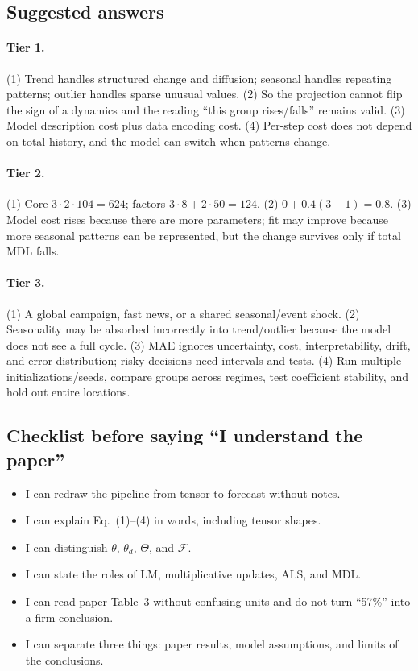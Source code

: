 \subsection*{Suggested answers}

\paragraph{Tier 1.}
(1) Trend handles structured change and diffusion; seasonal handles repeating patterns; outlier handles
sparse unusual values. (2) So the projection cannot flip the sign of a dynamics and the reading
``this group rises/falls'' remains valid. (3) Model description cost plus data encoding cost.
(4) Per-step cost does not depend on total history, and the model can switch when patterns change.

\paragraph{Tier 2.}
(1) Core $3\cdot2\cdot104=624$; factors $3\cdot8+2\cdot50=124$. (2) $0+0.4(3-1)=0.8$.
(3) Model cost rises because there are more parameters; fit may improve because more seasonal patterns
can be represented, but the change survives only if total MDL falls.

\paragraph{Tier 3.}
(1) A global campaign, fast news, or a shared seasonal/event shock. (2) Seasonality may be absorbed
incorrectly into trend/outlier because the model does not see a full cycle. (3) MAE ignores uncertainty,
cost, interpretability, drift, and error distribution; risky decisions need intervals and tests.
(4) Run multiple initializations/seeds, compare groups across regimes, test coefficient stability, and
hold out entire locations.

\subsection*{Checklist before saying ``I understand the paper''}

\begin{itemize}
  \item I can redraw the pipeline from tensor to forecast without notes.
  \item I can explain Eq.~(1)--(4) in words, including tensor shapes.
  \item I can distinguish $\theta$, $\theta_d$, $\Theta$, and $\mathcal{F}$.
  \item I can state the roles of LM, multiplicative updates, ALS, and MDL.
  \item I can read paper Table~3 without confusing units and do not turn ``57\%'' into a firm conclusion.
  \item I can separate three things: paper results, model assumptions, and limits of the conclusions.
\end{itemize}
